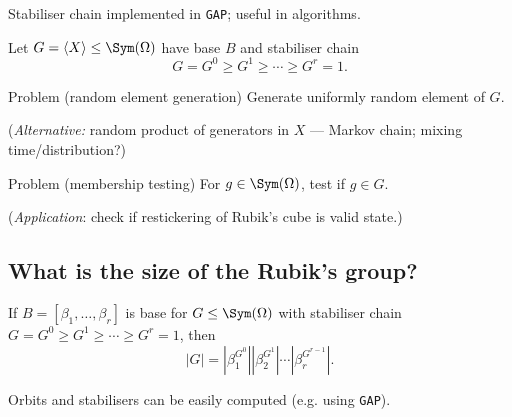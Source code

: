 \begin{slide}
    Stabiliser chain implemented in \texttt{GAP}; useful in algorithms. \pause

    Let $G = \langle X \rangle \leq \Sym(\Omega)$ have base $B$ and stabiliser chain
    $$G = G^0 \geq G^1 \geq \dotsb \geq G^r = 1.$$ \pause

    \begin{alertblock}{Problem (random element generation)}
        \vspace{0pt}
        Generate uniformly random element of $G$.

        (\textit{Alternative:} \pause random product of generators in $X$ --- Markov chain; mixing time/distribution?)
    \end{alertblock} \pause

    \begin{alertblock}{Problem (membership testing)}
        \vspace{0pt}
        For $g \in \Sym(\Omega)$, test if $g \in G$.

        (\textit{Application}: \pause check if restickering of Rubik's cube is valid state.)
    \end{alertblock}
\end{slide}

\subsection{What is the size of the Rubik's group?}

\begin{slide}
    \begin{theorem}
        \vspace{0pt}
        If $B = [\beta_1,\dotsc,\beta_r]$ is base for $G \leq \Sym(\Omega)$ with stabiliser chain $G = G^0 \geq G^1 \geq \dotsb \geq G^r = 1$, then
        $$|G| = |\beta_1^{G^0}||\beta_2^{G^1}| \dotsb |\beta_r^{G^{r-1}}|.$$
    \end{theorem}

    Orbits and stabilisers can be easily computed (e.g. using \texttt{GAP}).


\end{slide}